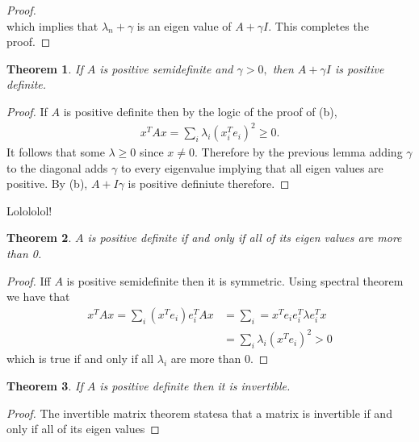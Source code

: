 \documentclass[letter]{article}
\newtheorem{theorem}{Theorem}
\newenvironment{menumerate}{%
  \edef\backupindent{\the\parindent}%
  \enumerate%
  \setlength{\parindent}{\backupindent}%
}{\endenumerate}
\begin{document}
\begin{menumerate}
\begin{menumerate}
\begin{proof}
\begin{equation}
       \end{equation} 
       which implies that $\lambda_n + \gamma$ is an eigen value of $A + \gamma I.$ This completes the proof.  
    \end{proof}
    \begin{theorem}
      If $A$ is positive semidefinite and $\gamma > 0,$ then $A + \gamma I$ is positive definite.
    \end{theorem}
    \begin{proof}
      If $A$ is positive definite then by the logic of the proof of (b), 
      \begin{equation}
          \begin{aligned}
            x^T A x = \sum_i \lambda_i (x_i^T e_i)^2 \geq 0.         
          \end{aligned}
         \end{equation}   
      It follows that some $\lambda \geq 0$ since $x \neq 0.$ Therefore by the previous lemma adding 
      $\gamma$ to the diagonal adds $\gamma$ to every eigenvalue implying that all eigen values are positive.
      By (b), $A + I\gamma$ is positive definiute therefore.
      \end{proof}
    \item Lolololol!
    \begin{theorem}
      $A$ is positive definite if and only if all of its eigen values are more than 0.
    \end{theorem}
    \begin{proof}
      Iff $A$ is positive semidefinite then it is symmetric. Using spectral theorem we have that 
      \begin{equation}
        \begin{aligned}
          x^TAx = \sum_i (x^Te_i)e_i^TAx &= \sum_i = x^Te_ie_i^T\lambda e_i^Tx \\
              &= \sum_i \lambda_i (x^Te_i)^2 > 0
         \end{aligned}   
      \end{equation}   
      which is true if and only if all $\lambda_i$ are more than 0.
    \end{proof}
    \item 
    \begin{theorem}
      If $A$ is positive definite then it is invertible.   
    \end{theorem}
    \begin{proof}
      The invertible matrix theorem statesa that a matrix is invertible if and only if all of its eigen values

\end{proof}
\end{menumerate}
\end{menumerate}
\end{document}
